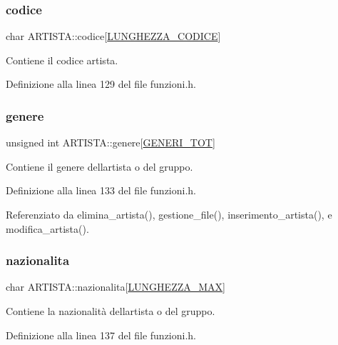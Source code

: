 \subsubsection{\texorpdfstring{codice}{codice}}
{\footnotesize\ttfamily char A\+R\+T\+I\+S\+T\+A\+::codice\mbox{[}\hyperlink{funzioni_8h_a15beac41f998f4495a79396160235665}{L\+U\+N\+G\+H\+E\+Z\+Z\+A\+\_\+\+C\+O\+D\+I\+CE}\mbox{]}}

Contiene il codice artista. 

Definizione alla linea 129 del file funzioni.\+h.

\mbox{\label{struct_a_r_t_i_s_t_a_a27c2d0af7e1f8ac38c84bcfc71f87f4b}} 
\subsubsection{\texorpdfstring{genere}{genere}}
{\footnotesize\ttfamily unsigned int A\+R\+T\+I\+S\+T\+A\+::genere\mbox{[}\hyperlink{funzioni_8h_aadfbb01ff59a52b086b4c96f1a5e0cd2}{G\+E\+N\+E\+R\+I\+\_\+\+T\+OT}\mbox{]}}

Contiene il genere dell\textquotesingle{}artista o del gruppo. 

Definizione alla linea 133 del file funzioni.\+h.



Referenziato da elimina\+\_\+artista(), gestione\+\_\+file(), inserimento\+\_\+artista(), e modifica\+\_\+artista().

\mbox{\label{struct_a_r_t_i_s_t_a_a9b2d858c8f1c17c58a15ad20eb10118e}} 
\subsubsection{\texorpdfstring{nazionalita}{nazionalita}}
{\footnotesize\ttfamily char A\+R\+T\+I\+S\+T\+A\+::nazionalita\mbox{[}\hyperlink{funzioni_8h_a2cdd71b92d6e869f8b094e32a6da6a62}{L\+U\+N\+G\+H\+E\+Z\+Z\+A\+\_\+\+M\+AX}\mbox{]}}

Contiene la nazionalità dell\textquotesingle{}artista o del gruppo. 

Definizione alla linea 137 del file funzioni.\+h.

\mbox{\label{struct_a_r_t_i_s_t_a_a8ddd53b0e7cbe5f893e13b26a0203005}} 
